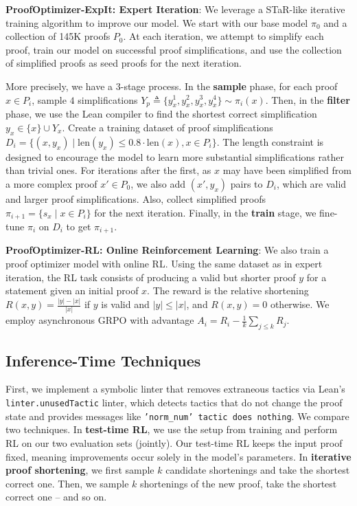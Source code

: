 \textbf{ProofOptimizer-ExpIt: Expert Iteration}: We leverage a STaR-like \citep{zelikman2022star} iterative training algorithm to improve our model. We start with our base model $\pi_0$ and a collection of 145K proofs $P_0$. At each iteration, we attempt to simplify each proof, train our model on successful proof simplifications, and use the collection of simplified proofs as seed proofs for the next iteration. 

More precisely, we have a 3-stage process. In the \textbf{sample} phase, for each proof $x \in P_i$, sample $4$ simplifications $Y_p \triangleq \{y_x^{1}, y_x^{2}, y_x^{3}, y_x^{4}\} \sim \pi_i(x)$. Then, in the \textbf{filter} phase, we use the Lean compiler to find the shortest correct simplification $y_x \in \{x\} \cup Y_x$. Create a training dataset of proof simplifications $D_i = \{(x, y_x) \mid \text{len}(y_x) \le 0.8 \cdot \text{len}(x), x \in P_i\}$. The length constraint is designed to encourage the model to learn more substantial simplifications rather than trivial ones. For iterations after the first, as $x$ may have been simplified from a more complex proof $x' \in P_0$, we also add $(x', y_x)$ pairs to $D_i$, which are valid and larger proof simplifications. Also, collect simplified proofs $\pi_{i+1} = \{s_x \mid x \in P_i\}$ for the next iteration. Finally, in the \textbf{train} stage, we fine-tune $\pi_i$ on $D_i$ to get $\pi_{i+1}$.

\textbf{ProofOptimizer-RL: Online Reinforcement Learning}: We also train a proof optimizer model with online RL. Using the same dataset as in expert iteration, the RL task consists of producing a valid but shorter proof $y$ for a statement given an initial proof $x$. The reward is the relative shortening $R(x, y) = \frac{|y| - |x|}{|x|}$
if $y$ is valid and $|y| \leq |x|$, and $R(x, y) = 0$ otherwise. We employ asynchronous GRPO \citep{shao2024grpo} with advantage $A_i = R_i - \frac{1}{k}\sum_{j \leq k} R_j$.

\subsection{Inference-Time Techniques} \label{subsec:inference-time-algorithms}
First, we implement a symbolic linter that removes extraneous tactics via Lean's \texttt{linter.unusedTactic} linter, which detects tactics that do not change the proof state and provides messages like \texttt{'norm\_num' tactic does nothing}. We compare two techniques. In \textbf{test-time RL}, we use the setup from training and perform RL on our two evaluation sets (jointly). Our test-time RL keeps the input proof fixed, meaning improvements occur solely in the model’s parameters. In \textbf{iterative proof shortening}, we first sample $k$ candidate shortenings and take the shortest correct one. Then, we sample $k$ shortenings of the new proof, take the shortest correct one -- and so on.